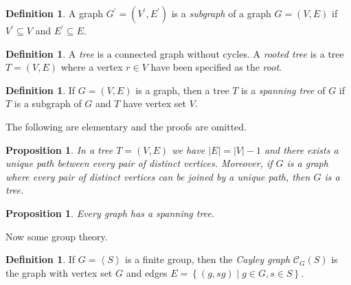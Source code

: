\documentclass[draft]{amsart}
\theoremstyle{plain}
\newtheorem{pr}[theorem]{Proposition}
\theoremstyle{definition}
\newtheorem{deff}[theorem]{Definition}
\theoremstyle{remark}
\providecommand{\abs}[1]{\left\lvert #1 \right\rvert}
\providecommand{\set}[1]{\left\lbrace #1 \right\rbrace}
\providecommand{\gen}[1]{\left\langle #1 \right\rangle}
\newcommand{\C}{\mathcal{C}}
\begin{document}
\begin{deff}
A graph $G^{\prime} = (V^{\prime}, E^{\prime})$ is a \emph{subgraph} of a graph $G = (V, E)$ if $V^{\prime} \subseteq V$ and $E^{\prime} \subseteq E$.
\end{deff}

\begin{deff} \label{def_tree}
A \emph{tree} is a connected graph without cycles. A \emph{rooted tree} is a tree $T = (V, E)$ where a vertex $r \in V$ have been specified as the \emph{root}.
\end{deff}

\begin{deff}
If $G = (V, E)$ is a graph, then a tree $T$ is a \emph{spanning tree} of $G$ if $T$ is a subgraph of $G$ and $T$ have vertex set $V$.
\end{deff}

The following are elementary and the proofs are omitted.
\begin{pr}
In a tree $T = (V, E)$ we have $\abs{E} = \abs{V} - 1$ and there exists a \emph{unique} path between every pair of distinct vertices. Moreover, if $G$ is a graph where every pair of distinct vertices can be joined by a unique path, then $G$ is a tree.
\end{pr}

\begin{pr}
Every graph has a spanning tree.
\end{pr}

Now some group theory.
\begin{deff}
If $G = \gen{S}$ is a finite group, then the \emph{Cayley graph} $\C_G(S)$ is the graph with vertex set $G$ and edges $E = \set{ (g, sg) \mid g \in G, s \in S}$.
\end{deff}

 

\end{document}

